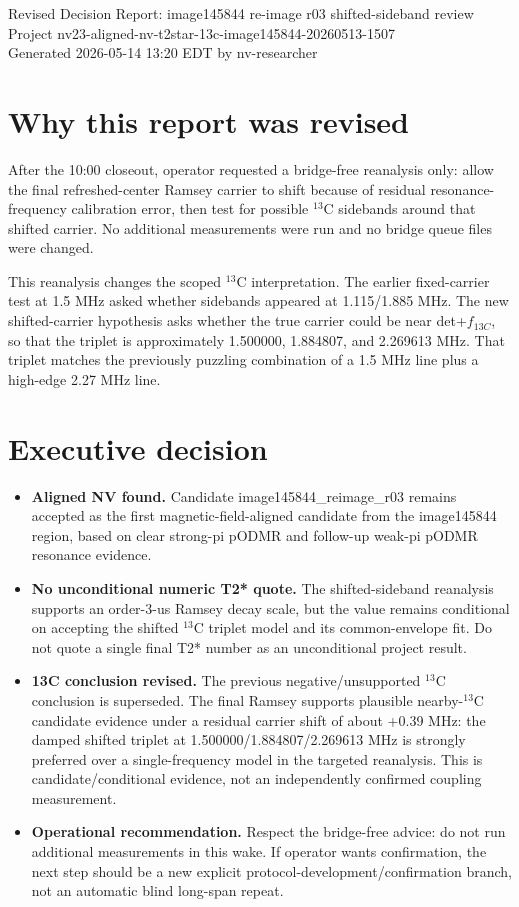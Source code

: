 \documentclass[10pt]{article}
\newcommand{\claim}[1]{\textbf{#1}}
\begin{document}
\begin{center}
{\Large Revised Decision Report: image145844 re-image r03 shifted-sideband review}\\
{\small Project nv23-aligned-nv-t2star-13c-image145844-20260513-1507}\\
Generated 2026-05-14 13:20 EDT by nv-researcher
\end{center}

\section*{Why this report was revised}
After the 10:00 closeout, operator requested a bridge-free reanalysis only: allow the final refreshed-center Ramsey carrier to shift because of residual resonance-frequency calibration error, then test for possible $^{13}$C sidebands around that shifted carrier. No additional measurements were run and no bridge queue files were changed.

This reanalysis changes the scoped $^{13}$C interpretation. The earlier fixed-carrier test at 1.5 MHz asked whether sidebands appeared at 1.115/1.885 MHz. The new shifted-carrier hypothesis asks whether the true carrier could be near det+$f_{13C}$, so that the triplet is approximately 1.500000, 1.884807, and 2.269613 MHz. That triplet matches the previously puzzling combination of a 1.5 MHz line plus a high-edge 2.27 MHz line.

\section*{Executive decision}
\begin{itemize}
\item \claim{Aligned NV found.} Candidate image145844\_reimage\_r03 remains accepted as the first magnetic-field-aligned candidate from the image145844 region, based on clear strong-pi pODMR and follow-up weak-pi pODMR resonance evidence.
\item \claim{No unconditional numeric T2* quote.} The shifted-sideband reanalysis supports an order-3-us Ramsey decay scale, but the value remains conditional on accepting the shifted $^{13}$C triplet model and its common-envelope fit. Do not quote a single final T2* number as an unconditional project result.
\item \claim{13C conclusion revised.} The previous negative/unsupported $^{13}$C conclusion is superseded. The final Ramsey supports plausible nearby-$^{13}$C candidate evidence under a residual carrier shift of about +0.39 MHz: the damped shifted triplet at 1.500000/1.884807/2.269613 MHz is strongly preferred over a single-frequency model in the targeted reanalysis. This is candidate/conditional evidence, not an independently confirmed coupling measurement.
\item \claim{Operational recommendation.} Respect the bridge-free advice: do not run additional measurements in this wake. If operator wants confirmation, the next step should be a new explicit protocol-development/confirmation branch, not an automatic blind long-span repeat.
\end{itemize}
\end{document}
